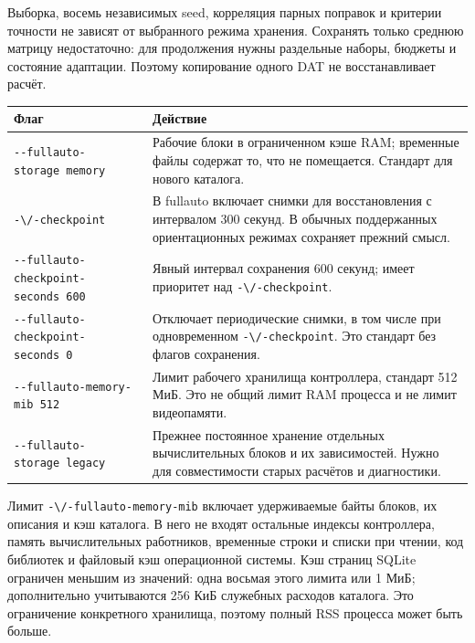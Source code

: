 Выборка, восемь независимых seed, корреляция парных поправок и критерии
точности не зависят от выбранного режима хранения. Сохранять только
среднюю матрицу недостаточно: для продолжения нужны раздельные наборы,
бюджеты и состояние адаптации. Поэтому копирование одного DAT не
восстанавливает расчёт.

\begin{longtable}[]{@{}
  >{\raggedright\arraybackslash}p{}
  >{\raggedright\arraybackslash}p{}@{}}
\toprule\noalign{}
\begin{minipage}[b]{\linewidth}\raggedright
Флаг
\end{minipage} & \begin{minipage}[b]{\linewidth}\raggedright
Действие
\end{minipage} \\
\midrule\noalign{}
\endhead
\bottomrule\noalign{}
\endlastfoot
\texttt{-\/-fullauto-storage\ memory} & Рабочие блоки в ограниченном
кэше RAM; временные файлы содержат то, что не помещается. Стандарт для
нового каталога. \\
\nolinkurl{-\/-checkpoint} & В fullauto включает снимки для восстановления
с интервалом 300 секунд. В обычных поддержанных ориентационных режимах
сохраняет прежний смысл. \\
\texttt{-\/-fullauto-checkpoint-seconds\ 600} & Явный интервал
сохранения 600 секунд; имеет приоритет над \nolinkurl{-\/-checkpoint}. \\
\texttt{-\/-fullauto-checkpoint-seconds\ 0} & Отключает периодические
снимки, в том числе при одновременном \nolinkurl{-\/-checkpoint}. Это
стандарт без флагов сохранения. \\
\texttt{-\/-fullauto-memory-mib\ 512} & Лимит рабочего хранилища
контроллера, стандарт 512 МиБ. Это не общий лимит RAM процесса и не
лимит видеопамяти. \\
\texttt{-\/-fullauto-storage\ legacy} & Прежнее постоянное хранение
отдельных вычислительных блоков и их зависимостей. Нужно для
совместимости старых расчётов и диагностики. \\
\end{longtable}

Лимит \nolinkurl{-\/-fullauto-memory-mib} включает удерживаемые байты
блоков, их описания и кэш каталога. В него не входят остальные индексы
контроллера, память вычислительных работников, временные строки и списки
при чтении, код библиотек и файловый кэш операционной системы. Кэш
страниц SQLite ограничен меньшим из значений: одна восьмая этого лимита
или 1 МиБ; дополнительно учитываются 256 КиБ служебных расходов
каталога. Это ограничение конкретного хранилища, поэтому полный RSS
процесса может быть больше.

